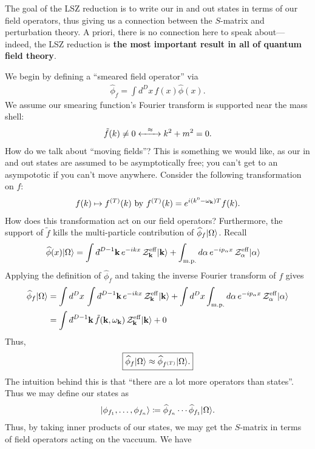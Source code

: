 \documentclass[11pt]{article}
\begin{document}
The goal of the LSZ reduction is to write our in and out
states in terms of our field operators, thus giving us a
connection between the $S$-matrix and perturbation theory.
A priori, there is no connection here to speak about---indeed, 
the LSZ reduction is \textbf{the most important
result in all of quantum field theory}.

We begin by defining a ``smeared field operator'' via
\begin{align*}
    \widehat{\phi}_f = \int d^D x \, f(x) \widehat{\phi}(x).
\end{align*}
We assume our smearing function's Fourier transform is supported 
near the mass shell:
\begin{align*}
    \tilde{f}(k) \neq 0 \xleftrightarrow{\: \: \: \: \approx \: \: \: \:} k^2 + m^2 = 0.
\end{align*}
How do we talk about ``moving fields''? This is something we
would like, as our in and out states are assumed to be asymptotically
free; you can't get to an asympototic if you can't move anywhere. 
Consider the following transformation on $f$:
\begin{align*}
    f(k) \mapsto f^{(T)}(k) \text{ by } f^{(T)}(k) = e^{i(k^0 - \omega_{\mathbf{k}})T} f(k).
\end{align*}
How does this transformation act on our field operators?
Furthermore, the support of $\tilde{f}$ kills the
multi-particle contribution of $\widehat{\phi}_{f} \lvert\Omega\rangle$.
Recall
\begin{align*}
    \widehat{\phi}(x) \ket{\Omega} & = \int \dbar^{D - 1} \bfk \, e^{-ikx}\, \mathcal{Z}^{\rm eff}_{\bfk} \ket{\bfk}
    + \int_{\rm m.p.} d\alpha \, e^{-ip_\alpha x} \, \mathcal{Z}^{\rm eff}_{\alpha} \ket{\alpha}
\end{align*}
Applying the definition of $\widehat{\phi}_f$ and taking the inverse 
Fourier transform of $f$ gives
\begin{align*}
    \widehat{\phi}_f \ket{\Omega} & = \int d^D x \, \int \dbar^{D - 1} \bfk \, e^{-ikx}\, \mathcal{Z}^{\rm eff}_{\bfk} \ket{\bfk}
    + \int d^D x \int_{\rm m.p.} d\alpha \, e^{-ip_\alpha x} \, \mathcal{Z}^{\rm eff}_{\alpha} \ket{\alpha}\\
    & = \int \dbar^{D - 1} \bfk \, \tilde{f}(\bfk, \omega_\bfk)\, \mathcal{Z}^{\rm eff}_{\bfk} \ket{\bfk} + 0
\end{align*}
Thus,
\begin{align*}
    \boxed{\widehat{\phi}_f \lvert\Omega\rangle \approx \widehat{\phi}_{f^{(T)}} \lvert\Omega\rangle.}
\end{align*}
The intuition behind this is that ``there are a lot more operators than
states''. Thus we may define our states as
\begin{align*}
    \lvert\phi_{f_1}, \ldots, \phi_{f_n}\rangle \coloneqq \widehat{\phi}_{f_n} \cdots \widehat{\phi}_{f_1} \lvert\Omega\rangle.
\end{align*}
Thus, by taking inner products of our states, we may get the $S$-matrix
in terms of field operators acting on the vaccuum. We have 
\end{document}

